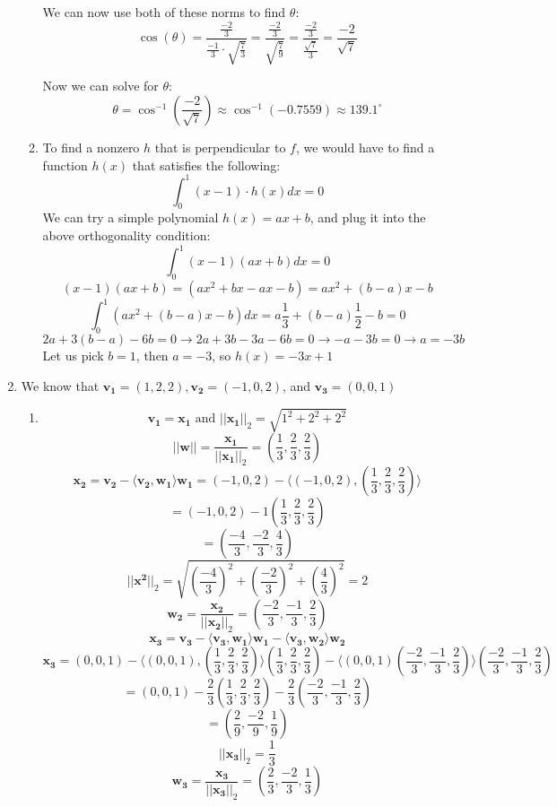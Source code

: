 \documentclass[12pt]{article}
\begin{document}
\begin{enumerate}[leftmargin=0em]
\begin{enumerate}[leftmargin=!]
    We can now use both of these norms to find $\theta$:
    \[ \cos(\theta) = \frac{\frac{-2}{3}}{\frac{-1}{3} \cdot \sqrt{\frac{7}{3}}} = \frac{\frac{-2}{3}}{\sqrt{\frac{7}{9}}} = \frac{\frac{-2}{3}}{\frac{\sqrt{7}}{3}} = \frac{-2}{\sqrt{7}}\]

    Now we can solve for $\theta$:
    \[\theta = \cos^{-1}(\frac{-2}{\sqrt{7}}) \approx \cos^{-1}(-0.7559) \approx 139.1^{\circ}\]
    \item
    To find a nonzero $h$ that is perpendicular to $f$, we would have to find a function $h(x)$ that satisfies the following:
    \[ \int_{0}^{1}(x-1) \cdot h(x) dx = 0\]
    We can try a simple polynomial $h(x) = ax + b$, and plug it into the above orthogonality condition:
    \[\int_{0}^{1}(x-1)(ax+b)dx = 0\]
    \[(x-1)(ax+b) = (ax^2+bx -ax - b) = ax^2 + (b-a)x - b\]
    \[\int_{0}^{1}(ax^2+(b-a)x-b)dx = a\frac{1}{3}+(b-a)\frac{1}{2}-b = 0\]
    \[2a+3(b-a) - 6b = 0 \rightarrow 2a+3b-3a-6b = 0 \rightarrow -a -3b = 0 \rightarrow a = -3b\]
    Let us pick $b=1$, then $a = -3$, so $h(x) = -3x+1$
  \end{enumerate}

  \item
  We know that $\mathbf{v_1} = (1, 2, 2), \mathbf{v_2} = (-1, 0, 2)$, and $\mathbf{v_3} = (0,0,1)$

  \begin{enumerate}[leftmargin=!]
    \item
    \[ \mathbf{v_1} = \mathbf{x_1} \text{ and } ||\mathbf{x_1}||_{2} = \sqrt{1^2+2^2+2^2}\]
    \[ ||\mathbf{w}|| = \frac{\mathbf{x_1}}{||\mathbf{x_1}||_2} = (\frac{1}{3}, \frac{2}{3}, \frac{2}{3}) \]
    \[ \mathbf{x_2} = \mathbf{v_2} - \langle \mathbf{v_2}, \mathbf{w_1} \rangle \mathbf{w_1} = (-1, 0, 2) - \langle (-1, 0, 2) , (\frac{1}{3}, \frac{2}{3}, \frac{2}{3}) \rangle\]
    \[ = (-1, 0, 2) - 1(\frac{1}{3}, \frac{2}{3}, \frac{2}{3})\]
    \[ = (\frac{-4}{3}, \frac{-2}{3}, \frac{4}{3})\]   
    \[||\mathbf{x^2}||_2 = \sqrt{(\frac{-4}{3})^{2} + (\frac{-2}{3})^{2} + (\frac{4}{3})^{2}} = 2\] 
    \[ \mathbf{w_2} = \frac{\mathbf{x_2}}{||\mathbf{x_2}||_2} = (\frac{-2}{3}, \frac{-1}{3}, \frac{2}{3})\]
    \[ \mathbf{x_3} = \mathbf{v_3} - \langle \mathbf{v_3}, \mathbf{w_1} \rangle \mathbf{w_1} - \langle \mathbf{v_3}, \mathbf{w_2} \rangle \mathbf{w_2}\]
    \[ \mathbf{x_3} = (0, 0, 1) - \langle (0, 0, 1), (\frac{1}{3}, \frac{2}{3}, \frac{2}{3})\rangle (\frac{1}{3}, \frac{2}{3}, \frac{2}{3}) - \langle (0,0,1) (\frac{-2}{3}, \frac{-1}{3}, \frac{2}{3}) \rangle (\frac{-2}{3}, \frac{-1}{3}, \frac{2}{3})\]
    \[ = (0,0,1) - \frac{2}{3}(\frac{1}{3}, \frac{2}{3}, \frac{2}{3}) - \frac{2}{3}(\frac{-2}{3}, \frac{-1}{3}, \frac{2}{3})\]
    \[ = (\frac{2}{9}, \frac{-2}{9}, \frac{1}{9})\]
    \[ || \mathbf{x_3} ||_2 = \frac{1}{3} \]
    \[ \mathbf{w_3} = \frac{\mathbf{x_3}}{||\mathbf{x_3}||_2} = (\frac{2}{3}, \frac{-2}{3}, \frac{1}{3})\]


\end{enumerate}
\end{enumerate}
\end{document}
